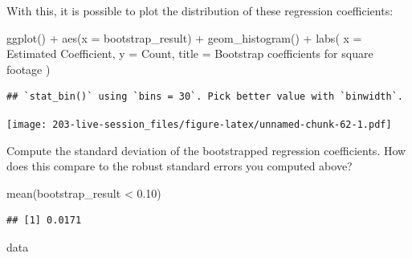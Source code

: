 \documentclass[
]{book}
\newenvironment{Shaded}{\begin{snugshade}}{\end{snugshade}}
\newcommand{\AttributeTok}[1]{\textcolor[rgb]{0.77,0.63,0.00}{#1}}
\newcommand{\FloatTok}[1]{\textcolor[rgb]{0.00,0.00,0.81}{#1}}
\newcommand{\FunctionTok}[1]{\textcolor[rgb]{0.00,0.00,0.00}{#1}}
\newcommand{\NormalTok}[1]{#1}
\newcommand{\SpecialCharTok}[1]{\textcolor[rgb]{0.00,0.00,0.00}{#1}}
\newcommand{\StringTok}[1]{\textcolor[rgb]{0.31,0.60,0.02}{#1}}
\theoremstyle{definition}
\theoremstyle{definition}
\theoremstyle{definition}
\theoremstyle{definition}
\theoremstyle{remark}
\begin{document}
With this, it is possible to plot the distribution of these regression coefficients:

\begin{Shaded}
\begin{Highlighting}[]
\FunctionTok{ggplot}\NormalTok{() }\SpecialCharTok{+} 
  \FunctionTok{aes}\NormalTok{(}\AttributeTok{x =}\NormalTok{ bootstrap\_result) }\SpecialCharTok{+} 
  \FunctionTok{geom\_histogram}\NormalTok{() }\SpecialCharTok{+} 
  \FunctionTok{labs}\NormalTok{(}
    \AttributeTok{x =} \StringTok{\textquotesingle{}Estimated Coefficient\textquotesingle{}}\NormalTok{, }
    \AttributeTok{y =} \StringTok{\textquotesingle{}Count\textquotesingle{}}\NormalTok{, }
    \AttributeTok{title =} \StringTok{\textquotesingle{}Bootstrap coefficients for square footage\textquotesingle{}}
\NormalTok{  )}
\end{Highlighting}
\end{Shaded}

\begin{verbatim}
## `stat_bin()` using `bins = 30`. Pick better value with `binwidth`.
\end{verbatim}

\texttt{[image: 203-live-session\_files/figure-latex/unnamed-chunk-62-1.pdf]}

Compute the standard deviation of the bootstrapped regression coefficients. How does this compare to the robust standard errors you computed above?

\begin{Shaded}
\begin{Highlighting}[]
\FunctionTok{mean}\NormalTok{(bootstrap\_result }\SpecialCharTok{\textless{}} \FloatTok{0.10}\NormalTok{)}
\end{Highlighting}
\end{Shaded}

\begin{verbatim}
## [1] 0.0171
\end{verbatim}

\begin{Shaded}
\begin{Highlighting}[]
\NormalTok{data}
\end{Highlighting}
\end{Shaded}
\end{document}

